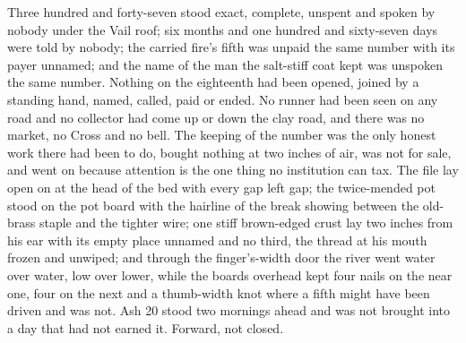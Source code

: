 Three hundred and forty-seven stood exact, complete, unspent and spoken by nobody under the Vail roof; six months and one hundred and sixty-seven days were told by nobody; the carried fire's fifth was unpaid the same number with its payer unnamed; and the name of the man the salt-stiff coat kept was unspoken the same number. Nothing on the eighteenth had been opened, joined by a standing hand, named, called, paid or ended. No runner had been seen on any road and no collector had come up or down the clay road, and there was no market, no Cross and no bell. The keeping of the number was the only honest work there had been to do, bought nothing at two inches of air, was not for sale, and went on because attention is the one thing no institution can tax. The file lay open on  at the head of the bed with every gap left gap; the twice-mended pot stood on the pot board with the hairline of the break showing between the old-brass staple and the tighter wire; one stiff brown-edged crust lay two inches from his ear with its empty place unnamed and no third, the thread at his mouth frozen and unwiped; and through the finger's-width door the river went water over water, low over lower, while the boards overhead kept four nails on the near one, four on the next and a thumb-width knot where a fifth might have been driven and was not. Ash 20 stood two mornings ahead and was not brought into a day that had not earned it. Forward, not closed.
